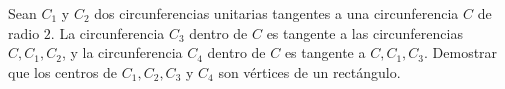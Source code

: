 Sean $C_1$ y $C_2$ dos circunferencias unitarias tangentes a una circunferencia $C$ de radio $2$. La circunferencia $C_3$ dentro de $C$ es tangente a las circunferencias $C,C_1,C_2$, y la circunferencia $C_4$ dentro de $C$ es tangente a $C,C_1,C_3$. Demostrar que los centros de $C_1,C_2,C_3$ y $C_4$ son vértices de un rectángulo.

